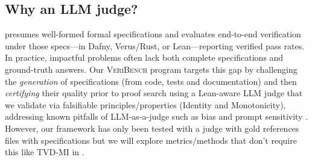 

\subsection{Why an LLM judge?}
\citet{bursuc2025benchmarkvericodingformallyverified} presumes well-formed formal specifications and evaluates end-to-end verification under those specs—in Dafny, Verus/Rust, or Lean—reporting verified pass rates. 
In practice, impactful problems often lack both complete specifications and ground-truth answers. 
Our \textsc{VeriBench} program targets this gap by challenging the \emph{generation} of specifications (from code, tests and documentation) and then \emph{certifying} their quality prior to proof search using a Lean-aware LLM judge that we validate via falsifiable principles/properties (Identity and Monotonicity), addressing known pitfalls of LLM-as-a-judge such as bias and prompt sensitivity \citep{Zheng2023MTBench,Kocmi2024HumanVsLLM,Li2024TrustLLMJudgments}. 
However, our framework has only been tested with a judge with gold references files with specifications but we will explore metrics/methods that don't require this like TVD-MI in \citep{robertson2025stepbystep}. 

